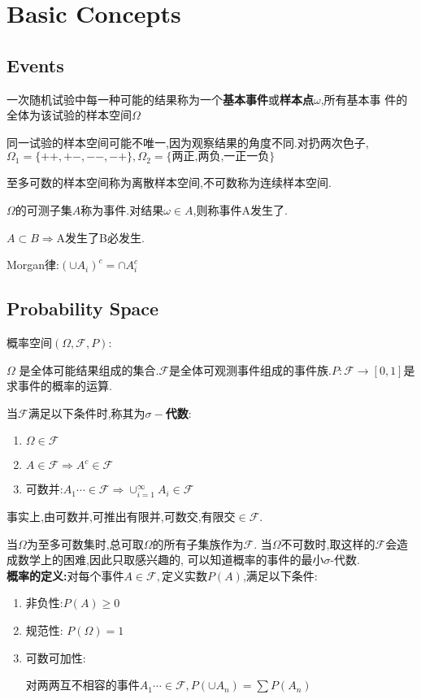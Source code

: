 
\section{Basic Concepts}
\subsection{Events}
一次随机试验中每一种可能的结果称为一个{\bf 基本事件}或{\bf 样本点$ \omega$},所有基本事
件的全体为该试验的样本空间$ \Omega$

同一试验的样本空间可能不唯一,因为观察结果的角度不同.对扔两次色子,$ \Omega_1 =
\{++,+-,--,-+\}, \Omega_2 = \{\texttt{两正,两负,一正一负}\}$

至多可数的样本空间称为离散样本空间,不可数称为连续样本空间.

$ \Omega$的可测子集$ A$称为事件.对结果$ \omega \in A$,则称事件A发生了.

$ A \subset B \Rightarrow $A发生了B必发生.

Morgan律:$ (\cup A_i)^c = \cap A_i^c$

\subsection{Probability Space}

概率空间$ (\Omega, \mathcal{F}, P)$:

$\Omega$ 是全体可能结果组成的集合.$ \mathcal{F}$是全体可观测事件组成的事件族.$ P:\mathcal{F} \rightarrow [0,1]$是求事件的概率的运算.

当$ \mathcal{F}$满足以下条件时,称其为{\bf $ \sigma -$代数}:
\begin{enumerate}
	\item $ \Omega \in \mathcal{F}$
	\item $ A\in \mathcal{F} \Rightarrow A^c \in \mathcal{F}$
	\item 可数并:$ A_1 \cdots \in \mathcal{F} \Rightarrow  \cup_{i = 1}^{\infty}{A_i}
		\in \mathcal{F}$
\end{enumerate}
事实上,由可数并,可推出有限并,可数交,有限交$ \in \mathcal{F}$.

当$ \Omega$为至多可数集时,总可取$ \Omega$的所有子集族作为$ \mathcal{F}$.
当$ \Omega$不可数时,取这样的$ \mathcal{F}$会造成数学上的困难,因此只取感兴趣的,
可以知道概率的事件的最小$ \sigma$-代数.
\\

{\bf 概率的定义:}对每个事件$ A\in \mathcal{F},$定义实数$ P(A)$,满足以下条件:
\begin{enumerate}
	\item 非负性:$ P(A) \ge 0$
	\item 规范性: $ P(\Omega) = 1$
	\item 可数可加性:

		对两两互不相容的事件$ A_1 \cdots \in \mathcal{F}, P(\cup{A_n}) =
		\sum{P(A_n)}$
\end{enumerate}

